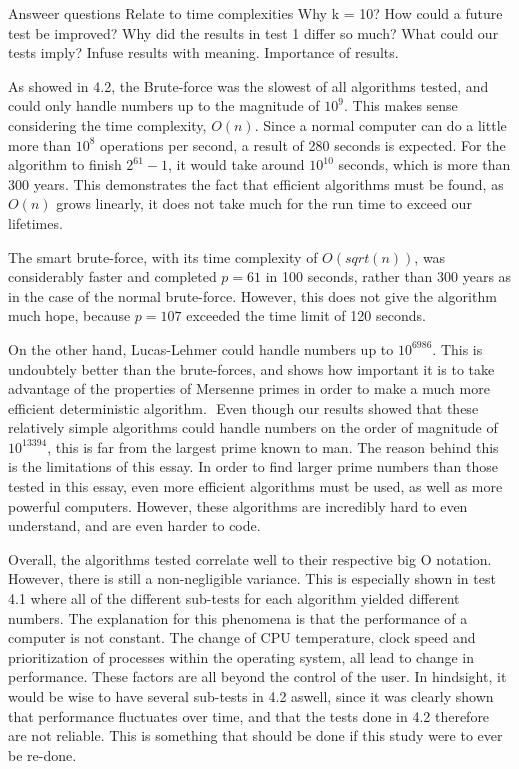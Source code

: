 \documentclass[main.tex]{subfiles}
\begin{document}
Answeer questions
Relate to time complexities
Why k = 10?
How could a future test be improved?
Why did the results in test 1 differ so much?
What could our tests imply?
Infuse results with meaning.
Importance of results.

As showed in 4.2, the Brute-force was the slowest of all algorithms tested, and
could only handle numbers up to the magnitude of $10^{9}$. This makes sense
considering the time complexity, $O(n)$. Since a normal computer can do a little
more than $10^{8}$ operations per second, a result of 280 seconds is expected.
For the algorithm to finish $2^{61}-1$, it would take around $10^{10}$ seconds,
which is more than 300 years. This demonstrates the fact that efficient
algorithms must be found, as $O(n)$ grows linearly, it does not take much for
the run time to exceed our lifetimes.

The smart brute-force, with its time complexity of $O(sqrt(n))$, was
considerably faster and completed $p=61$ in 100 seconds, rather than 300 years
as in the case of the normal brute-force. However, this does not give the
algorithm much hope, because $p=107$ exceeded the time limit of 120 seconds.

On the other hand, Lucas-Lehmer could handle numbers up to $10^{6986}$. This is
undoubtely better than the brute-forces, and shows how important it is to take
advantage of the properties of Mersenne primes in order to make a much more
efficient deterministic algorithm. 
﻿
Even though our results showed that these relatively simple algorithms could
handle numbers on the order of magnitude of $10^{13394}$, this is far from the
largest prime known to man. The reason behind this is the limitations of this
essay. In order to find larger prime numbers than those tested in this essay,
even more efficient algorithms must be used, as well as more powerful computers.
However, these algorithms are incredibly hard to even understand, and are even
harder to code.

Overall, the algorithms tested correlate well to their respective big O
notation. However, there is still a non-negligible variance. This is especially
shown in test 4.1 where all of the different sub-tests for each algorithm
yielded different numbers. The explanation for this phenomena is that the
performance of a computer is not constant. The change of CPU temperature, clock
speed and prioritization of processes within the operating system, all lead to
change in performance. These factors are all beyond the control of the user. In
hindsight, it would be wise to have several sub-tests in 4.2 aswell, since it
was clearly shown that performance fluctuates over time, and that the tests done
in 4.2 therefore are not reliable. This is something that should be done if this
study were to ever be re-done. 
\end{document}
